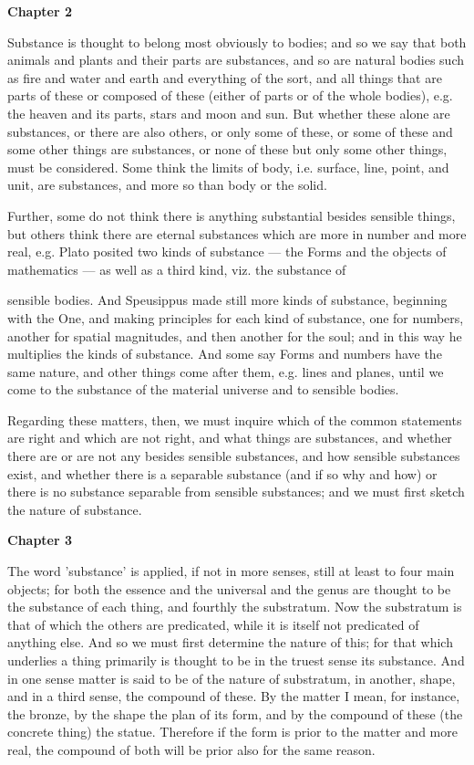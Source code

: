 \textbf{Chapter 2}

Substance is thought to belong most obviously to bodies; and so we say that both animals and plants and their parts are substances, and so are natural bodies such as fire and water and earth and everything of the sort, and all things that are parts of these or composed of these (either of parts or of the whole bodies), e.g. the heaven and its parts, stars and moon and sun. But whether these alone are substances, or there are also others, or only some of these, or some of these and some other things are substances, or none of these but only some other things, must be considered. Some think the limits of body, i.e. surface, line, point, and unit, are substances, and more so than body or the solid.

Further, some do not think there is anything substantial besides sensible things, but others think there are eternal substances which are more in number and more real, e.g. Plato posited two kinds of substance — the Forms and the objects of mathematics — as well as a third kind, viz. the substance of

sensible bodies. And Speusippus made still more kinds of substance, beginning with the One, and making principles for each kind of substance, one for numbers, another for spatial magnitudes, and then another for the soul; and in this way he multiplies the kinds of substance. And some say Forms and numbers have the same nature, and other things come after them, e.g. lines and planes, until we come to the substance of the material universe and to sensible bodies.

Regarding these matters, then, we must inquire which of the common statements are right and which are not right, and what things are substances, and whether there are or are not any besides sensible substances, and how sensible substances exist, and whether there is a separable substance (and if so why and how) or there is no substance separable from sensible substances; and we must first sketch the nature of
substance.

\textbf{Chapter 3}

The word 'substance' is applied, if not in more senses, still at least to four main objects; for both the essence and the universal and the genus are thought to be the substance of each thing, and fourthly the substratum. Now the substratum is that of which the others are predicated, while it is itself not predicated of anything else. And so we must first determine the nature of this; for that which underlies a thing primarily is thought to be in the truest sense its substance. And in one sense matter is said to be of the nature of substratum, in another, shape, and in a third sense, the compound of these. By the matter I mean, for instance, the bronze, by the shape the plan of its form, and by the compound of these (the concrete thing) the statue. Therefore if the form is prior to the matter and more real, the compound of both will be prior also for the same reason.

